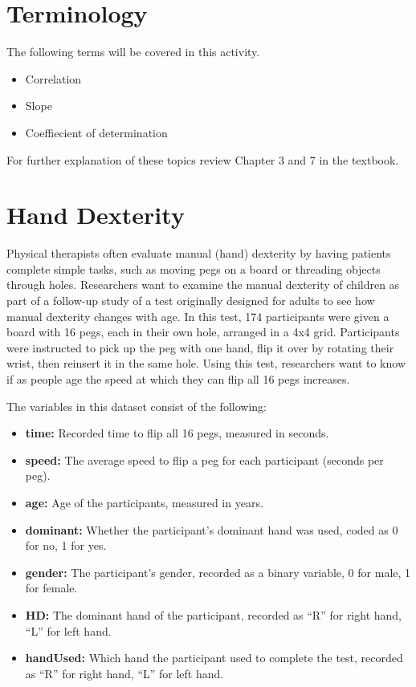 \documentclass[
]{report}
\begin{document}
\hypertarget{terminology-3}{%
\section{Terminology}\label{terminology-3}}

The following terms will be covered in this activity.

\begin{itemize}
\item
  Correlation
\item
  Slope
\item
  Coeffiecient of determination
\end{itemize}

For further explanation of these topics review Chapter 3 and 7 in the textbook.

\hypertarget{hand-dexterity}{%
\section{Hand Dexterity}\label{hand-dexterity}}

Physical therapists often evaluate manual (hand) dexterity by having patients complete simple tasks, such as moving pegs on a board or threading objects through holes. Researchers want to examine the manual dexterity of children as part of a follow-up study of a test originally designed for adults to see how manual dexterity changes with age. In this test, 174 participants were given a board with 16 pegs, each in their own hole, arranged in a 4x4 grid. Participants were instructed to pick up the peg with one hand, flip it over by rotating their wrist, then reinsert it in the same hole. Using this test, researchers want to know if as people age the speed at which they can flip all 16 pegs increases.

The variables in this dataset consist of the following:

\begin{itemize}
\item
  \textbf{time:} Recorded time to flip all 16 pegs, measured in seconds.
\item
  \textbf{speed:} The average speed to flip a peg for each participant (seconds per peg).
\item
  \textbf{age:} Age of the participants, measured in years.
\item
  \textbf{dominant:} Whether the participant's dominant hand was used, coded as 0 for no, 1 for yes.
\item
  \textbf{gender:} The participant's gender, recorded as a binary variable, 0 for male, 1 for female.
\item
  \textbf{HD:} The dominant hand of the participant, recorded as ``R'' for right hand, ``L'' for left hand.
\item
  \textbf{handUsed:} Which hand the participant used to complete the test, recorded as ``R'' for right hand, ``L'' for left hand.
\end{itemize}
\end{document}
